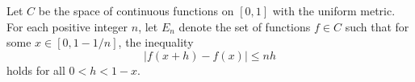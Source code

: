Let $C$ be the space of continuous functions on $[0,1]$ with the uniform metric. For each positive integer $n$, let $E_n$ denote the set of functions $f \in C$ such that for some $x \in [0, 1 - 1/n]$, the inequality
$$|f(x + h) - f(x)| \leq n h$$
holds for all $0 < h < 1 - x$.
